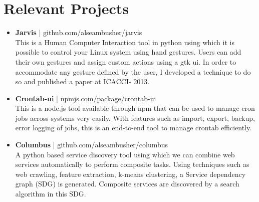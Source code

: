 \documentclass[a4paper]{article} %
\begin{document}
\section{Relevant Projects}
\begin{itemize}
 \item \textbf{Jarvis} | github.com/alseambusher/jarvis\\ 
 This is a Human Computer Interaction tool in python using which it is possible to control your Linux system using hand gestures. Users can add their own gestures and assign custom actions using a gtk ui. In order to accommodate any gesture defined by the user, I developed a technique to do so and published a paper at ICACCI- 2013. 
 
 \item \textbf{Crontab-ui} | npmjs.com/package/crontab-ui\\
 This is a node.js tool available through npm that can be used to manage cron jobs across systems very easily. With features such as import, export, backup, error logging of jobs, this is an end-to-end tool to manage crontab efficiently.
 
 \item \textbf{Columbus} | github.com/alseambusher/columbus\\
 A python based service discovery tool using which we can combine web services automatically to perform composite tasks. Using techniques such as web crawling, feature extraction, k-means clustering, a Service dependency graph (SDG) is generated. Composite services are discovered by a search algorithm in this SDG.
 

\end{itemize}
\end{document}
